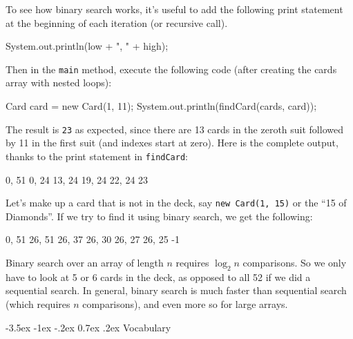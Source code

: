 \documentclass[12pt]{book}
\makeatletter
\theoremstyle{exercise}
\newcommand{\java}[1]{\verb"#1"}
\renewcommand{\section}{\@startsection{section}{1}{\z@}%
    {-3.5ex \@plus -1ex \@minus -.2ex}%
    {0.7ex \@plus.2ex}%
    {\normalfont\Large\bfseries}}
\newcommand{\java}[1]{\lstinline{#1}} %
\makeatother
\begin{document}
To see how binary search works, it's useful to add the following print statement at the beginning of each iteration (or recursive call).

\begin{code}
    System.out.println(low + ", " + high);
\end{code}


Then in the \java{main} method, execute the following code (after creating the cards array with nested loops):

\begin{code}
    Card card = new Card(1, 11);
    System.out.println(findCard(cards, card));
\end{code}

The result is \java{23} as expected, since there are 13 cards in the zeroth suit followed by 11 in the first suit (and indexes start at zero).
Here is the complete output, thanks to the print statement in \java{findCard}:

\begin{stdout}
0, 51
0, 24
13, 24
19, 24
22, 24
23
\end{stdout}

Let's make up a card that is not in the deck, say \java{new Card(1, 15)} or the ``15 of Diamonds''.
If we try to find it using binary search, we get the following:

\begin{stdout}
0, 51
26, 51
26, 37
26, 30
26, 27
26, 25
-1
\end{stdout}

%

Binary search over an array of length $n$ requires $\log_2 n$ comparisons.
So we only have to look at 5 or 6 cards in the deck, as opposed to all 52 if we did a sequential search.
In general, binary search is much faster than sequential search (which requires $n$ comparisons), and even more so for large arrays.


\section{Vocabulary}
\end{document}
